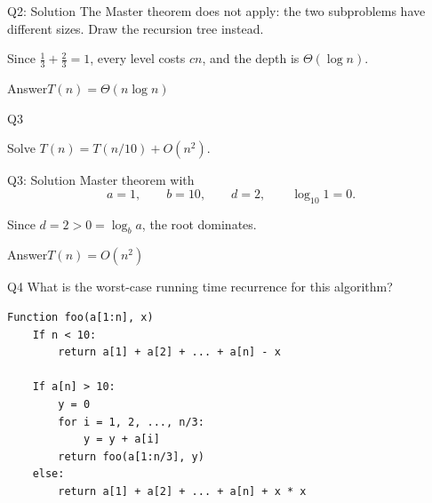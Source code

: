 \documentclass[10pt,aspectratio=169]{beamer}
\newcommand{\answer}[1]{\begin{alertblock}{Answer}#1\end{alertblock}}
\begin{document}
\begin{frame}{Q2: Solution}
  The Master theorem does \alert{not} apply: the two subproblems have different
  sizes. Draw the recursion tree instead.

  \begin{center}
  \end{center}

  Since $\tfrac13 + \tfrac23 = 1$, every level costs $cn$, and the depth is
  $\Theta(\log n)$.

  \answer{$T(n) = \Theta(n \log n)$}
\end{frame}

\begin{frame}{Q3}
  \begin{center}
    \Large
    Solve \quad $T(n) = T(n/10) + O(n^2)$.
  \end{center}
\end{frame}

\begin{frame}{Q3: Solution}
  Master theorem with
  \[
    a = 1, \qquad b = 10, \qquad d = 2,
    \qquad \log_{10} 1 = 0.
  \]

  \bigskip
  Since $d = 2 > 0 = \log_b a$, the root dominates.

  \answer{$T(n) = O(n^2)$}
\end{frame}

\begin{frame}[fragile]{Q4}
  What is the worst-case running time recurrence for this algorithm?

  \begin{lstlisting}
Function foo(a[1:n], x)
    If n < 10:
        return a[1] + a[2] + ... + a[n] - x

    If a[n] > 10:
        y = 0
        for i = 1, 2, ..., n/3:
            y = y + a[i]
        return foo(a[1:n/3], y)
    else:
        return a[1] + a[2] + ... + a[n] + x * x
  \end{lstlisting}
\end{frame}
\end{document}
